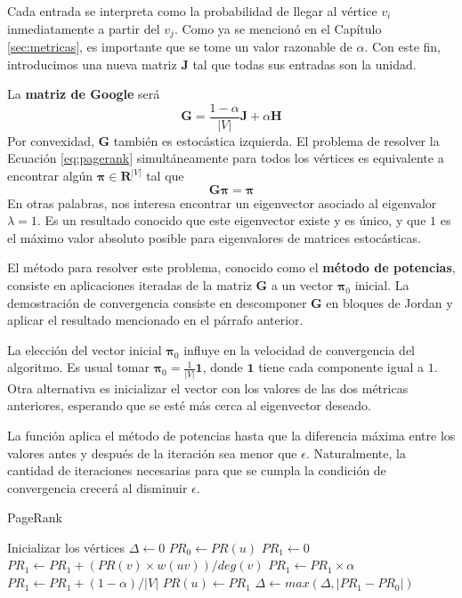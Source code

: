 \documentclass[journal]{IEEEtran}
\let\MYoriglatexcaption\caption
\renewcommand{\caption}[2][\relax]{\MYoriglatexcaption[#2]{#2}}
\newcommand{\matr}[1]{\mathbf{#1}} %
\begin{document}
Cada entrada se interpreta como la probabilidad de llegar al vértice \(v_i\) inmediatamente a partir del \(v_j\). Como ya se mencionó en el Capítulo \ref{sec:metricas}, es importante que se tome un valor razonable de \(\alpha\). Con este fin, introducimos una nueva matriz \(\matr{J}\) tal que todas sus entradas son la unidad.

La \textbf{matriz de Google} será \cite{langville}
\begin{equation}
	\matr{G} = \frac{1-\alpha}{|V|} \matr{J} + \alpha \matr{H}
\end{equation}
Por convexidad, \(\matr{G}\) también es estocástica izquierda. El problema de resolver la Ecuación \ref{eq:pagerank} simultáneamente para todos los vértices es equivalente a encontrar algún \(\bm{\pi} \in \mathbf{R}^{|V|} \) tal que
\begin{equation}
	\matr{G} \bm{\pi} = \bm{\pi}
\end{equation}
En otras palabras, nos interesa encontrar un eigenvector asociado al eigenvalor \(\lambda = 1\). Es un resultado conocido que este eigenvector existe y es único, y que \(1\) es el máximo valor absoluto posible para eigenvalores de matrices estocásticas\cite{meyer}.

El método para resolver este problema, conocido como el \textbf{método de potencias}, consiste en aplicaciones iteradas de la matriz \(\matr{G}\) a un vector \(\bm{\pi}_0\) inicial. La demostración de convergencia consiste en descomponer \(\matr{G}\) en bloques de Jordan y aplicar el resultado mencionado en el párrafo anterior\cite{langville}.

La elección del vector inicial \(\bm{\pi}_0\) influye en la velocidad de convergencia del algoritmo. Es usual tomar \(\bm{\pi}_0 = \frac{1}{|V|} \bm{1} \), donde \(\bm{1}\) tiene cada componente igual a \(1\). Otra alternativa es inicializar el vector con los valores de las dos métricas anteriores, esperando que se esté más cerca al eigenvector deseado.

La función  aplica el método de potencias hasta que la diferencia máxima entre los valores antes y después de la iteración sea menor que \(\epsilon\). Naturalmente, la cantidad de iteraciones necesarias para que se cumpla la condición de convergencia crecerá al disminuir \(\epsilon\).

\begin{algorithm}[H]
	\caption{PageRank} \label{alg:pagerank}
	\begin{algorithmic}
			\State Inicializar los vértices
			\Do
				\State $\Delta \gets 0$
					\State $PR_0 \gets PR(u)$
					\State $PR_1 \gets 0$
						\State $PR_1 \gets PR_1 + (PR(v) \times w(uv))/deg(v)$
					\EndFor
					\State $PR_1 \gets PR_1 \times \alpha$
					\State $PR_1 \gets PR_1 + (1-\alpha)/|V|$
					\State $PR(u) \gets PR_1$
					\State $\Delta \gets max(\Delta, |PR_1 - PR_0|)$
				\EndFor
			\doWhile{$\Delta > \epsilon$}
		\EndFunction
	\end{algorithmic}
\end{algorithm}
\end{document}
